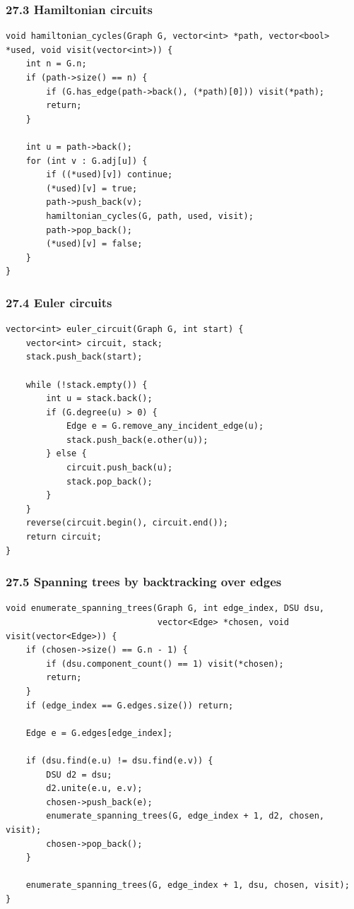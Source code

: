 \documentclass[11pt]{article}
\begin{document}
\subsubsection{27.3 Hamiltonian circuits}\label{hamiltonian-circuits}

\begin{verbatim}
void hamiltonian_cycles(Graph G, vector<int> *path, vector<bool> *used, void visit(vector<int>)) {
    int n = G.n;
    if (path->size() == n) {
        if (G.has_edge(path->back(), (*path)[0])) visit(*path);
        return;
    }

    int u = path->back();
    for (int v : G.adj[u]) {
        if ((*used)[v]) continue;
        (*used)[v] = true;
        path->push_back(v);
        hamiltonian_cycles(G, path, used, visit);
        path->pop_back();
        (*used)[v] = false;
    }
}
\end{verbatim}

\subsubsection{27.4 Euler circuits}\label{euler-circuits}

\begin{verbatim}
vector<int> euler_circuit(Graph G, int start) {
    vector<int> circuit, stack;
    stack.push_back(start);

    while (!stack.empty()) {
        int u = stack.back();
        if (G.degree(u) > 0) {
            Edge e = G.remove_any_incident_edge(u);
            stack.push_back(e.other(u));
        } else {
            circuit.push_back(u);
            stack.pop_back();
        }
    }
    reverse(circuit.begin(), circuit.end());
    return circuit;
}
\end{verbatim}

\subsubsection{27.5 Spanning trees by backtracking over edges}\label{spanning-trees-by-backtracking-over-edges}

\begin{verbatim}
void enumerate_spanning_trees(Graph G, int edge_index, DSU dsu,
                              vector<Edge> *chosen, void visit(vector<Edge>)) {
    if (chosen->size() == G.n - 1) {
        if (dsu.component_count() == 1) visit(*chosen);
        return;
    }
    if (edge_index == G.edges.size()) return;

    Edge e = G.edges[edge_index];

    if (dsu.find(e.u) != dsu.find(e.v)) {
        DSU d2 = dsu;
        d2.unite(e.u, e.v);
        chosen->push_back(e);
        enumerate_spanning_trees(G, edge_index + 1, d2, chosen, visit);
        chosen->pop_back();
    }

    enumerate_spanning_trees(G, edge_index + 1, dsu, chosen, visit);
}
\end{verbatim}
\end{document}
